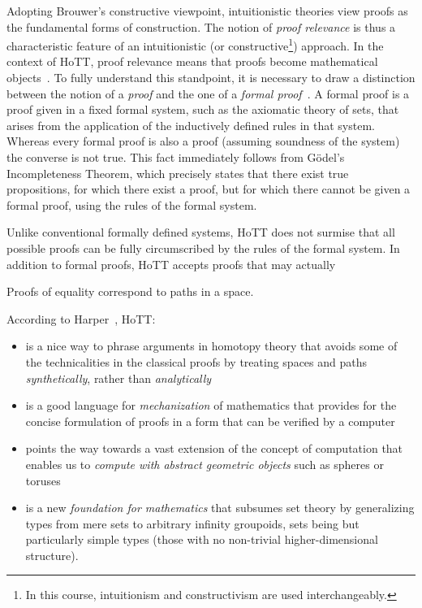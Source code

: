 \documentclass[12pt]{article}
\begin{document}
Adopting Brouwer's constructive viewpoint, intuitionistic theories view proofs as the
fundamental forms of construction.  The notion of \emph{proof relevance} is thus a
characteristic feature of an intuitionistic (or constructive\footnote{In this course,
  intuitionism and constructivism are used interchangeably.}) approach.  In the context of
\gls{HoTT}, proof relevance means that proofs become mathematical objects~\cite{Harper2013}.
To fully understand this standpoint, it is necessary to draw a distinction between the notion
of a \emph{proof} and the one of a \emph{formal proof}~\cite{Harper2013,Harper2012}.  A formal
proof is a proof given in a fixed formal system, such as the axiomatic theory of sets, that
arises from the application of the inductively defined rules in that system.  Whereas every
formal proof is also a proof (assuming soundness of the system) the converse is not true.  This
fact immediately follows from G\"{o}del's Incompleteness Theorem, which precisely states that
there exist true propositions, for which there exist a proof, but for which there cannot be
given a formal proof, using the rules of the formal system.

Unlike conventional formally defined systems, \gls{HoTT}  does not surmise that all possible
proofs can be fully circumscribed by the rules of the formal system.  In addition to formal
proofs, \gls{HoTT} accepts proofs that may actually 

Proofs of equality correspond to paths in a space.

According to Harper~\cite{Harper2013a,Harper2013}, HoTT:

\begin{itemize}

\item is a nice way to phrase arguments in homotopy theory that avoids some of the technicalities
  in the classical proofs by treating spaces and paths \emph{synthetically}, rather than
  \emph{analytically}

\item is a good language for \emph{mechanization} of mathematics that provides for the concise
  formulation of proofs in a form that can be verified by a computer

\item points the way towards a vast extension of the concept of computation that enables us to
  \emph{compute with abstract geometric objects} such as spheres or toruses

\item is a new \emph{foundation for mathematics} that subsumes set theory by generalizing
  types from mere sets to arbitrary infinity groupoids, sets being but particularly simple
  types (those with no non-trivial higher-dimensional structure).

\end{itemize}
\end{document}
